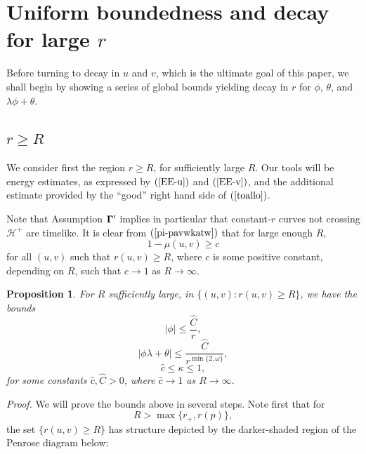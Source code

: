 \documentclass{article}
\newtheorem{proposition}{Proposition}[section]
\begin{document}
\section{Uniform boundedness and decay for large $r$}
\label{largersec}
Before turning to decay in $u$ and $v$, which is the ultimate goal
of this paper, we shall begin by showing a series of 
global bounds yielding decay in $r$ for $\phi$,
$\theta$, and $\lambda\phi+\theta$. 

\subsection{$r\ge R$}
We consider first the region $r\ge R$, for sufficiently large $R$. Our tools
will be energy estimates, as expressed by $(\ref{EE-u})$
and $(\ref{EE-v})$, and the additional estimate provided by the ``good'' right
hand side of 
$(\ref{toallo})$.

Note that Assumption ${\bf \Gamma}'$ implies in particular that
constant-$r$ curves not crossing $\mathcal{H}^+$ are 
timelike.
It is clear from $(\ref{pi-pavwkatw})$ that for large enough $R$, 
\begin{equation}
\label{pekcokmuhim}
1-\mu(u,v)\ge c
\end{equation}
for all $(u,v)$ such that $r(u,v)\ge R$, 
where $c$ is some positive constant, depending on $R$, such that
$c\to1$ as $R\to\infty$.

\begin{proposition} 
\label{giapolumegaloR}
For $R$ sufficiently large,
in $\{(u,v):r(u,v)\ge R\}$, we have the bounds 
\label{mprop}
\begin{equation}
\label{makrua1}
|\phi|\le \frac{\hat{C}}r,
\end{equation}
\begin{equation}
\label{makrua2}
|\phi\lambda+\theta|\le \frac{\hat{C}}{r^{\min\{2,\omega\}}},
\end{equation}
\begin{equation}
\label{makrua3}
\hat{c}\le\kappa\le1,
\end{equation}
for some constants $\hat{c},\hat{C}>0$, where
$\hat{c}\to1$ as $R\to\infty$.
\end{proposition}

\noindent\emph{Proof.} 
We will prove the bounds above in several steps. 
Note first that for 
\begin{equation}
\label{blakeia}
R>\max\{r_+,r(p)\},
\end{equation}
the set
$\{r(u,v)\ge R\}$ has structure  depicted by the darker-shaded region of
the Penrose diagram below:
\begin{figure}[ht]
\centering

\end{figure}
\end{document}
